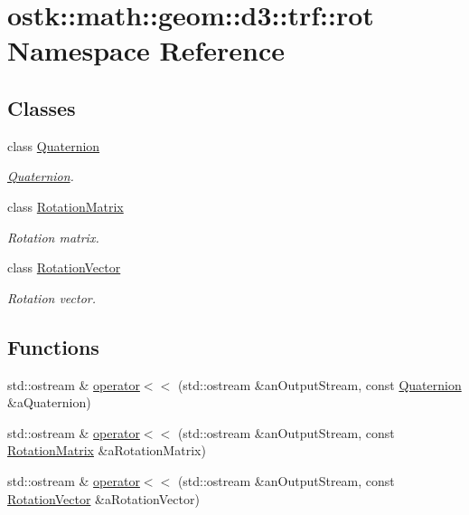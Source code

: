 \hypertarget{namespaceostk_1_1math_1_1geom_1_1d3_1_1trf_1_1rot}{}\section{ostk\+:\+:math\+:\+:geom\+:\+:d3\+:\+:trf\+:\+:rot Namespace Reference}
\label{namespaceostk_1_1math_1_1geom_1_1d3_1_1trf_1_1rot}
\subsection*{Classes}
\begin{DoxyCompactItemize}
\item 
class \hyperlink{classostk_1_1math_1_1geom_1_1d3_1_1trf_1_1rot_1_1_quaternion}{Quaternion}
\begin{DoxyCompactList}\small\item\em \hyperlink{classostk_1_1math_1_1geom_1_1d3_1_1trf_1_1rot_1_1_quaternion}{Quaternion}. \end{DoxyCompactList}\item 
class \hyperlink{classostk_1_1math_1_1geom_1_1d3_1_1trf_1_1rot_1_1_rotation_matrix}{Rotation\+Matrix}
\begin{DoxyCompactList}\small\item\em Rotation matrix. \end{DoxyCompactList}\item 
class \hyperlink{classostk_1_1math_1_1geom_1_1d3_1_1trf_1_1rot_1_1_rotation_vector}{Rotation\+Vector}
\begin{DoxyCompactList}\small\item\em Rotation vector. \end{DoxyCompactList}\end{DoxyCompactItemize}
\subsection*{Functions}
\begin{DoxyCompactItemize}
\item 
std\+::ostream \& \hyperlink{namespaceostk_1_1math_1_1geom_1_1d3_1_1trf_1_1rot_af606d732f296e6b0a7e35d5023a59915}{operator$<$$<$} (std\+::ostream \&an\+Output\+Stream, const \hyperlink{classostk_1_1math_1_1geom_1_1d3_1_1trf_1_1rot_1_1_quaternion}{Quaternion} \&a\+Quaternion)
\item 
std\+::ostream \& \hyperlink{namespaceostk_1_1math_1_1geom_1_1d3_1_1trf_1_1rot_a44f63ac9ffcaf5993609c3229eb2b91b}{operator$<$$<$} (std\+::ostream \&an\+Output\+Stream, const \hyperlink{classostk_1_1math_1_1geom_1_1d3_1_1trf_1_1rot_1_1_rotation_matrix}{Rotation\+Matrix} \&a\+Rotation\+Matrix)
\item 
std\+::ostream \& \hyperlink{namespaceostk_1_1math_1_1geom_1_1d3_1_1trf_1_1rot_a8079bca5341bbc79c343ef3be7e49d7b}{operator$<$$<$} (std\+::ostream \&an\+Output\+Stream, const \hyperlink{classostk_1_1math_1_1geom_1_1d3_1_1trf_1_1rot_1_1_rotation_vector}{Rotation\+Vector} \&a\+Rotation\+Vector)
\end{DoxyCompactItemize}


